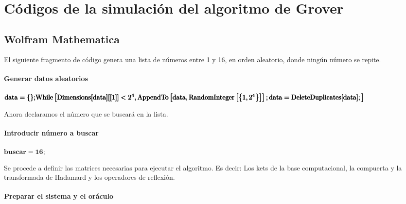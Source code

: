 \chapter{Códigos de la simulación del algoritmo de Grover}
\label{ch:grovercod}

\section{Wolfram Mathematica}

El siguiente fragmento de código genera una lista de números entre 1 y 16, en orden aleatorio, donde ningún número se repite.

\subsubsection*{Generar datos aleatorios}

\begin{doublespace}
\noindent\(\pmb{\text{data}=\{\};}\\
\pmb{\text{While}\left[\text{Dimensions}[\text{data}][[1]]<2^4,\text{AppendTo}\left[\text{data},\text{RandomInteger}\left[\left\{1,2^4\right\}\right]\right];\text{data}=\text{DeleteDuplicates}[\text{data}];\right]}\)
\end{doublespace}

Ahora declaramos el número que se buscará en la lista.

\subsubsection*{Introducir n{\' u}mero a buscar}

\begin{doublespace}
\noindent\(\pmb{\text{buscar}=16;}\)
\end{doublespace}

Se procede a definir las matrices necesarias para ejecutar el algoritmo. Es decir: Los kets de la base computacional, la compuerta y la transformada de Hadamard y los operadores de reflexión.

\subsubsection*{Preparar el sistema y el or{\' a}culo}

